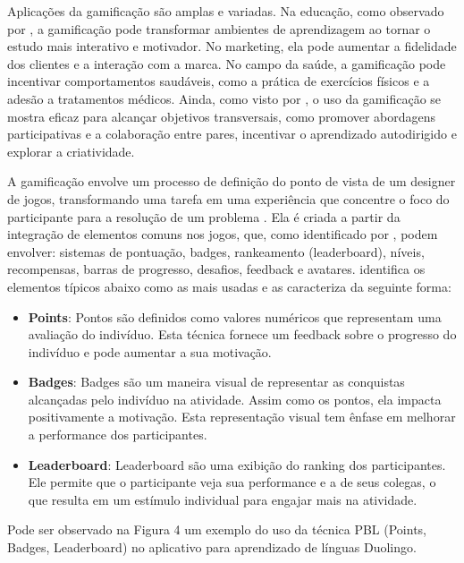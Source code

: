 \documentclass[
	12pt,
	openright,
	twoside,
	a4paper,
	english,
	brazil
	]{abntex2}
\begin{document}
Aplicações da gamificação são amplas e variadas. Na educação, como observado por , a gamificação pode transformar ambientes de aprendizagem ao tornar o estudo mais interativo e motivador. No marketing, ela pode aumentar a fidelidade dos clientes e a interação com a marca. No campo da saúde, a gamificação pode incentivar comportamentos saudáveis, como a prática de exercícios físicos e a adesão a tratamentos médicos. Ainda, como visto por , o uso da gamificação se mostra eficaz para alcançar objetivos transversais, como promover abordagens participativas e a colaboração entre pares, incentivar o aprendizado autodirigido e explorar a criatividade.

A gamificação envolve um processo de definição do ponto de vista de um designer de jogos, transformando uma tarefa em uma experiência que concentre o foco do participante para a resolução de um problema \cite{Fardo_2013}. Ela é criada a partir da integração de elementos comuns nos jogos, que, como identificado por , podem envolver: sistemas de pontuação, badges, rankeamento (leaderboard), níveis, recompensas, barras de progresso, desafios, feedback e avatares.  identifica os elementos típicos abaixo como as mais usadas e as caracteriza da seguinte forma:
\begin{itemize}
  \item \textbf{Points}: Pontos são definidos como valores numéricos que representam uma avaliação do indivíduo. Esta técnica fornece um feedback sobre o progresso do indivíduo e pode aumentar a sua motivação.
  
  \item \textbf{Badges}: Badges são um maneira visual de representar as conquistas alcançadas pelo indivíduo na atividade. Assim como os pontos, ela impacta positivamente a motivação. Esta representação visual tem ênfase em melhorar a performance dos participantes.
  
  \item \textbf{Leaderboard}: Leaderboard são uma exibição do ranking dos participantes. Ele permite que o participante veja sua performance e a de seus colegas, o que resulta em um estímulo individual para engajar mais na atividade.
\end{itemize}

Pode ser observado na Figura 4 um exemplo do uso da técnica PBL (Points, Badges, Leaderboard) no aplicativo para aprendizado de línguas Duolingo.
\end{document}
